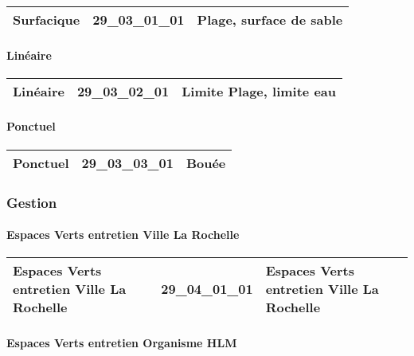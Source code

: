 \documentclass[12pt,titlepage,oneside]{book}
\begin{document}
\renewcommand{\arraystretch}{1.2}
\begin{supertabular}{|p{10cm}|c|p{15cm}|}
 Surfacique & 29\_03\_01\_01 & Plage, surface de sable\\
\hline
\end{supertabular}


\paragraph{Linéaire}
\noindent
\vspace{\baselineskip}

\renewcommand{\arraystretch}{1.2}
\begin{supertabular}{|p{10cm}|c|p{15cm}|}
 Linéaire & 29\_03\_02\_01 & Limite Plage, limite eau\\
\hline
\end{supertabular}


\paragraph{Ponctuel}
\noindent
\vspace{\baselineskip}

\renewcommand{\arraystretch}{1.2}
\begin{supertabular}{|p{10cm}|c|p{15cm}|}
 Ponctuel & 29\_03\_03\_01 & Bouée\\
\hline
\end{supertabular}

\subsubsection{\large Gestion}
\paragraph{Espaces Verts entretien Ville La Rochelle}
\noindent
\vspace{\baselineskip}

\renewcommand{\arraystretch}{1.2}
\begin{supertabular}{|p{10cm}|c|p{15cm}|}
 Espaces Verts entretien Ville La Rochelle & 29\_04\_01\_01 & Espaces Verts entretien Ville La Rochelle\\
\hline
\end{supertabular}


\paragraph{Espaces Verts entretien Organisme HLM}
\noindent
\vspace{\baselineskip}
\end{document}
